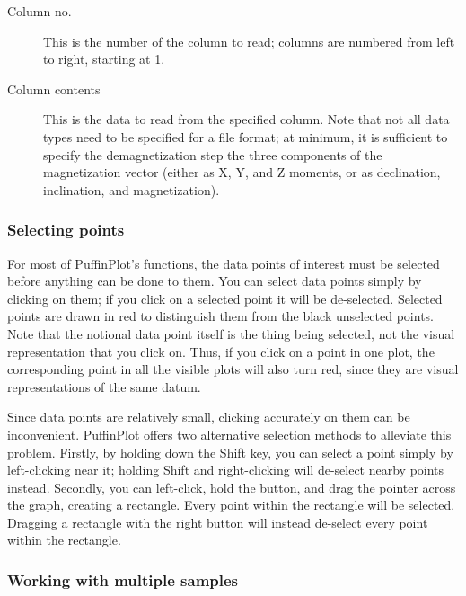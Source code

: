 \documentclass[a4paper,british]{article}
\newcommand{\ppcmd}[1]{\textsf{#1}} %
\begin{document}
\begin{description}

\item[Column no.] This is the number of the column to read; columns are
  numbered from left to right, starting at 1.

\item[Column contents] This is the data to read from the specified column.
  Note that not all data types need to be specified for a file format; at
  minimum, it is sufficient to specify the demagnetization step the three
  components of the magnetization vector (either as X, Y, and Z moments, or
  as declination, inclination, and magnetization).

\end{description}

\subsubsection{Selecting points}

For most of PuffinPlot's functions, the data points of interest must be
selected before anything can be done to them. You can select data points
simply by clicking on them; if you click on a selected point it will be
de-selected. Selected points are drawn in red to distinguish them from the
black unselected points. Note that the notional data point itself is the
thing being selected, not the visual representation that you click on. Thus,
if you click on a point in one plot, the corresponding point in all the
visible plots will also turn red, since they are visual representations of
the same datum.

Since data points are relatively small, clicking accurately on them can be
inconvenient. PuffinPlot offers two alternative selection methods to
alleviate this problem. Firstly, by holding down the \ppcmd{Shift} key, you
can select a point simply by left-clicking near it; holding \ppcmd{Shift} and
right-clicking will de-select nearby points instead. Secondly, you can
left-click, hold the button, and drag the pointer across the graph, creating
a rectangle. Every point within the rectangle will be selected. Dragging a
rectangle with the right button will instead de-select every point within the
rectangle.

\subsubsection{Working with multiple samples}
\end{document}
